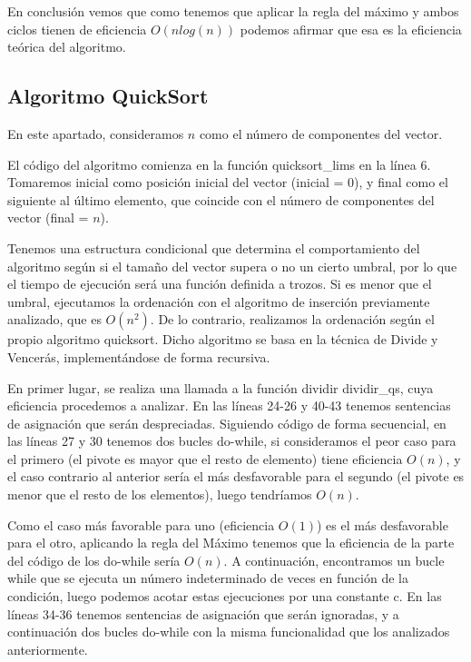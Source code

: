 \documentclass{homework}
\begin{document}
    En conclusión vemos que como tenemos que aplicar la regla del máximo y ambos ciclos tienen de eficiencia $O(nlog(n))$ podemos afirmar que esa es la eficiencia
    teórica del algoritmo. 

    \subsection{Algoritmo QuickSort}
    
     

    En este apartado, consideramos $n$ como el número de componentes del vector. 

    El código del algoritmo comienza en la función quicksort\_lims en la línea 6. Tomaremos inicial 
    como posición inicial del vector (inicial = $0$), y final como el siguiente al último elemento, 
    que coincide con el número de componentes del vector (final = $n$).
    
    Tenemos una estructura condicional que determina el comportamiento del algoritmo según si el tamaño del vector 
    supera o no un cierto umbral, por lo que el tiempo de ejecución será una función definida a trozos. Si es menor 
    que el umbral, ejecutamos la ordenación con el algoritmo de inserción previamente analizado, que es $O(n^2)$. De lo
    contrario, realizamos la ordenación según el propio algoritmo quicksort. Dicho algoritmo se basa en la técnica de Divide
    y Vencerás, implementándose de forma recursiva. 
    
    En primer lugar, se realiza una llamada a la función dividir dividir\_qs, 
    cuya eficiencia procedemos a analizar. En las líneas 24-26 y 40-43 tenemos sentencias de asignación que serán despreciadas. 
    Siguiendo código de forma secuencial, en las líneas 27 y 30 tenemos dos bucles do-while, si consideramos el peor caso para 
    el primero (el pivote es mayor que el resto de elemento) tiene eficiencia $O(n)$, y el caso contrario al anterior sería el 
    más desfavorable para el segundo (el pivote es menor que el resto de los elementos), luego tendríamos $O(n)$. 
    
    Como el caso más 
    favorable para uno (eficiencia $O(1)$) es el más desfavorable para el otro, aplicando la regla del Máximo tenemos que la 
    eficiencia de la parte del código de los do-while sería $O(n)$.  A continuación, encontramos un bucle while que se ejecuta un 
    número indeterminado de veces en función de la condición, luego podemos acotar estas ejecuciones por una constante c. En las 
    líneas 34-36 tenemos sentencias de asignación que serán ignoradas, y a continuación dos bucles do-while con la misma funcionalidad
    que los analizados anteriormente. 
    
\end{document}
